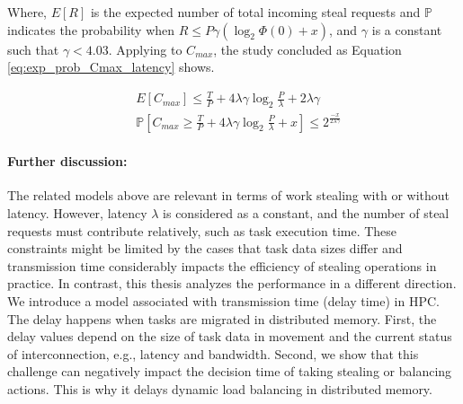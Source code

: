 Where, $E[R]$ is the expected number of total incoming steal requests and $\mathbb{P}$ indicates the probability when $R \leq P \gamma (\log_{2} \Phi(0) + x)$, and $\gamma$ is a constant such that $\gamma < 4.03$. Applying to $C_{max}$, the study concluded as Equation \ref{eq:exp_prob_Cmax_latency} shows.

\begin{equation} \label{eq:exp_prob_Cmax_latency}
\begin{split}
	& E[C_{max}] \leq \frac{T}{P} + 4\lambda\gamma\log_{2} \frac{P}{\lambda} + 2\lambda\gamma \\
	& \mathbb{P}[C_{max} \geq \frac{T}{P} + 4\lambda\gamma\log_{2} \frac{P}{\lambda} + x] \leq 2^{\frac{-x}{2\lambda\gamma}}
\end{split}
\end{equation}


\paragraph{Further discussion:}
The related models above are relevant in terms of work stealing with or without latency. However, latency $\lambda$ is considered as a constant, and the number of steal requests must contribute relatively, such as task execution time. These constraints might be limited by the cases that task data sizes differ and transmission time considerably impacts the efficiency of stealing operations in practice. In contrast, this thesis analyzes the performance in a different direction. We introduce a model associated with transmission time (delay time) in HPC. The delay happens when tasks are migrated in distributed memory. First, the delay values depend on the size of task data in movement and the current status of interconnection, e.g., latency and bandwidth. Second, we show that this challenge can negatively impact the decision time of taking stealing or balancing actions. This is why it delays dynamic load balancing in distributed memory.


